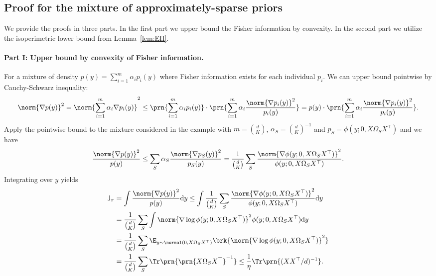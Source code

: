 \documentclass[11pt]{article}
\newcommand{\de}{\mathrm{d}}
\newcommand{\jfunc}{\mathsf{J}}
\begin{document}
\subsection{Proof for the mixture of approximately-sparse priors} \label{proof:applications-perturbed-sparse}
We provide the proofs in three parts. In the first part we upper bound the Fisher information by convexity. In the second part we utilize the isoperimetric lower bound from Lemma~\ref{lem:EII}.

\paragraph{Part I: Upper bound by convexity of Fisher information.} For a mixture of density $p(y) = \sum_{i=1}^m \alpha_i p_i(y)$ where Fisher information exists for each individual $p_i$. We can upper bound pointwise by Cauchy-Schwarz inequality:
\begin{align*}
    \norm{\nabla p(y)}^2 = \norm{\sum_{i=1}^m \alpha_i \nabla p_i(y)}^2 \leq \prn{\sum_{i=1}^m \alpha_i p_i(y)} \cdot \prn{ \sum_{i=1}^m \alpha_i \frac{\norm{\nabla p_i(y)}^2}{p_i(y)}}= p(y) \cdot \prn{ \sum_{i=1}^m \alpha_i \frac{\norm{\nabla p_i(y)}^2}{p_i(y)}}.
\end{align*}
Apply the pointwise bound to the mixture considered in the example with $m=\binom{d}{K}$, $\alpha_S = \binom{d}{K}^{-1}$ and $p_S = \phi(y; 0, X \Omega_S X^\top)$ and we have
\begin{align*}
    \frac{\norm{\nabla p(y)}^2}{p(y)} \leq \sum_{S} \alpha_S  \frac{\norm{\nabla p_S(y)}^2}{p_S(y)} = \frac{1}{\binom{d}{K}} \sum_S \frac{\norm{\nabla \phi(y; 0, X\Omega_S X^\top)}^2}{\phi(y; 0, X\Omega_S X^\top)}.
\end{align*}
Integrating over $y$ yields
\begin{align*}
    \jfunc_{\pi} &= \int \frac{\norm{\nabla p(y)}^2}{p(y)} \de y \leq \int \frac{1}{\binom{d}{K}} \sum_S \frac{\norm{\nabla \phi(y; 0, X\Omega_S X^\top)}^2}{\phi(y; 0, X\Omega_S X^\top)} \de y \nonumber \\
    & =  \frac{1}{\binom{d}{K}} \sum_S \int \norm{\nabla \log \phi(y; 0, X\Omega_S X^\top)}^2\phi(y; 0, X\Omega_S X^\top) \de y \\
    & = \frac{1}{\binom{d}{K}} \sum_{S} \E_{y \sim \normal(0,X \Omega_S X^\top)} \brk{\norm{\nabla \log \phi(y; 0, X\Omega_S X^\top)}^2}   \\
    &= \frac{1}{\binom{d}{K}} \sum_S \Tr \prn{\prn{X\Omega_S X^\top}^{-1}} \leq \frac{1}{\eta} \Tr \prn{(XX^\top/d)^{-1}}.
\end{align*}
\end{document}
